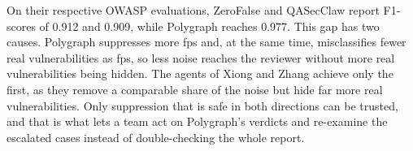 On their respective OWASP evaluations, ZeroFalse and QASecClaw report F1-scores
of 0.912 and 0.909, while Polygraph reaches 0.977. This gap has two causes.
Polygraph suppresses more \acp{fp} and, at the same time, misclassifies fewer
real vulnerabilities as \acp{fp}, so less noise reaches the reviewer without
more real vulnerabilities being hidden. The agents of Xiong and Zhang achieve
only the first, as they remove a comparable share of the noise but hide far more
real vulnerabilities. Only suppression that is safe in both directions can be
trusted, and that is what lets a team act on Polygraph's verdicts and re-examine
the escalated cases instead of double-checking the whole report.
